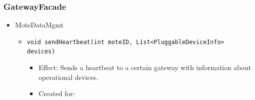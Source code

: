     \subsubsection{GatewayFacade}
        \begin{itemize}
            \item MoteDataMgmt
            \begin{itemize}
                \item \texttt{void sendHeartbeat(int moteID, List<PluggableDeviceInfo> devices)}
                \begin{itemize}
                    \item Effect: Sends a heartbeat to a certain gateway with information about operational devices.
                    \item Created for:
                \end{itemize}
            \end{itemize}


\end{itemize}
